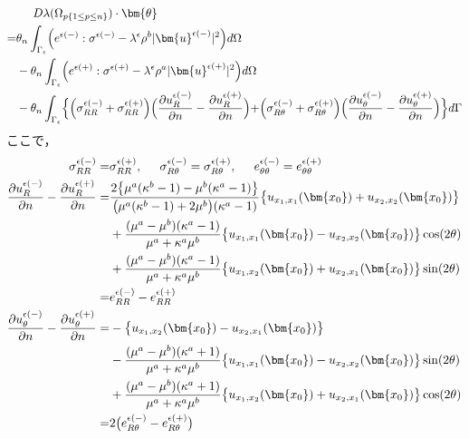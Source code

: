\begin{align}
	&\hspace{0.5cm}D\lambda(\Omega_{p\{1\leq p\leq n\}})\cdot\bm{\theta}
	\nonumber
	\\
	=&\theta_{n}\int_{\Gamma_\epsilon}
	\Bigr(e^{\epsilon(-)}:\sigma^{\epsilon(-)}
	-\lambda^{\epsilon}\rho^{b}|\bm{u}^{\epsilon(-)}|^{2}\Bigl) d\Omega
	\nonumber
	\\
	&-\theta_{n}\int_{\Gamma_\epsilon}
	\Bigr(e^{\epsilon(+)}:\sigma^{\epsilon(+)}
	-\lambda^{\epsilon}\rho^{a}|\bm{u}^{\epsilon(+)}|^{2}\Bigl) d\Omega
	\nonumber
	\\
	&-\theta_{n}\int_{\Gamma_{\epsilon}}\Bigl\{
	\Bigr(\sigma_{RR}^{\epsilon(-)}+\sigma_{RR}^{\epsilon(+)}\Bigl)
		\Bigl(\frac{\partial u_{R}^{\epsilon(-)}}{\partial n}-\frac{\partial u_{R}^{\epsilon(+)}}{\partial n}\Bigr)
	+	\Bigr(\sigma_{R\theta}^{\epsilon(-)}+\sigma_{R\theta}^{\epsilon(+)}\Bigl)
		\Bigl(\frac{\partial u_{\theta}^{\epsilon(-)}}{\partial n}-\frac{\partial u_{\theta}^{\epsilon(+)}}{\partial n}\Bigr)
	\Bigl\}d\Gamma
	\label{eq:SDForTDRTh}
\end{align}
ここで，
\begin{align}
	\sigma_{RR}^{\epsilon(-)}=&\sigma_{RR}^{\epsilon(+)},\hspace{0.5cm}
	\sigma_{R\theta}^{\epsilon(-)}=\sigma_{R\theta}^{\epsilon(+)},\hspace{0.5cm}
	e_{\theta\theta}^{\epsilon(-)}=e_{\theta\theta}^{\epsilon(+)}
	\nonumber
	\\
	\frac{\partial u_{R}^{\epsilon(-)}}{\partial n}-\frac{\partial u_{R}^{\epsilon(+)}}{\partial n}
		=&\frac{2\bigl\{\mu^{a}(\kappa^{b}-1)-\mu^{b}(\kappa^{a}-1)\bigr\}}{\bigl(\mu^{a}(\kappa^{b}-1)+2\mu^{b}\bigr)(\kappa^{a}-1)}
		\bigl\{u_{x_{1},x_{1}}(\bm{x_{0}})+u_{x_{2},x_{2}}(\bm{x_{0}})\bigr\}
		\nonumber
		\\
		&+\frac{(\mu^{a}-\mu^{b})(\kappa^{a}-1)}{\mu^{a}+\kappa^{a}\mu^{b}}
		\bigl\{u_{x_{1},x_{1}}(\bm{x_{0}})-u_{x_{2},x_{2}}(\bm{x_{0}})\bigr\}\cos(2\theta)
		\nonumber
		\\
		&+\frac{(\mu^{a}-\mu^{b})(\kappa^{a}-1)}{\mu^{a}+\kappa^{a}\mu^{b}}
		\bigl\{u_{x_{1},x_{2}}(\bm{x_{0}})+u_{x_{2},x_{1}}(\bm{x_{0}})\bigr\}\sin(2\theta)
		\nonumber
		\\
		=&e_{RR}^{\epsilon(-)}-e_{RR}^{\epsilon(+)}
		\nonumber
		\\
	\frac{\partial u_{\theta}^{\epsilon(-)}}{\partial n}-\frac{\partial u_{\theta}^{\epsilon(+)}}{\partial n}
		=&-\bigl\{u_{x_{1},x_{2}}(\bm{x_{0}})-u_{x_{2},x_{1}}(\bm{x_{0}})\bigr\}
		\nonumber
		\\
		&-\frac{(\mu^{a}-\mu^{b})(\kappa^{a}+1)}{\mu^{a}+\kappa^{a}\mu^{b}}
		\bigl\{u_{x_{1},x_{1}}(\bm{x_{0}})-u_{x_{2},x_{2}}(\bm{x_{0}})\bigr\}\sin(2\theta)
		\nonumber
		\\
		&+\frac{(\mu^{a}-\mu^{b})(\kappa^{a}+1)}{\mu^{a}+\kappa^{a}\mu^{b}}
		\bigl\{u_{x_{1},x_{2}}(\bm{x_{0}})+u_{x_{2},x_{1}}(\bm{x_{0}})\bigr\}\cos(2\theta)
		\nonumber
		\\
		=&2\bigl(e_{R\theta}^{\epsilon(-)}-e_{R\theta}^{\epsilon(+)}\bigr)
	\label{eq:SDForTDRTh}
\end{align}

